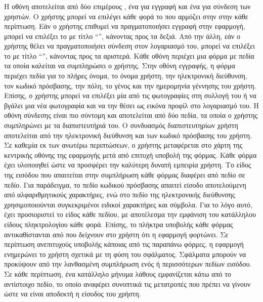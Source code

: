 \subsubsection{}
Η οθόνη αποτελείται από δύο επιμέρους , ένα για εγγραφή και ένα για σύνδεση των χρηστών. Ο χρήστης μπορεί να επιλέγει κάθε φορά το  που αρμόζει στην στην κάθε περίπτωση. Εάν ο χρήστης επιθυμεί να πραγματοποιήσει εγγραφή στην εφαρμογή, μπορεί να επιλέξει το  με τίτλο ``\textit{}'', κάνοντας  προς τα δεξιά. Από την άλλη, εάν ο χρήστης θέλει να πραγματοποιήσει σύνδεση στον λογαριασμό του, μπορεί να επιλέξει το  με τίτλο ``\textit{}'', κάνοντας  προς τα αριστερά.
\newline
\indent
Κάθε οθόνη περιέχει μια φόρμα με πεδία τα οποία καλείται να συμπληρώσει ο χρήστης. Στην οθόνη εγγραφής, η φόρμα περιέχει πεδία για το πλήρες όνομα, το όνομα χρήστη, την ηλεκτρονική διεύθυνση, τον κωδικό πρόσβασης, την πόλη, το γένος και την ημερομηνία γέννησης του χρήστη. Επίσης, ο χρήστης μπορεί να επιλέξει μία από τις φωτογραφίες στη συλλογή του ή να βγάλει μια νέα φωτογραφία και να την θέσει ως εικόνα προφίλ στο λογαριασμό του. Η οθόνη σύνδεσης είναι πιο σύντομη και αποτελείται από δύο πεδία, τα οποία ο χρήστης συμπληρώνει με τα διαπιστευτήριά του. Ο συνδυασμός διαπιστευτηρίων χρήστη αποτελείται από την ηλεκτρονική διεύθυνση και των κωδικό πρόσβασης του χρήστη. Σε καθεμία εκ των ανωτέρω περιπτώσεων, ο χρήστης μεταφέρεται στο χάρτη της κεντρικής οθόνης της εφαρμογής μετά από επιτυχή υποβολή της φόρμας.
\newline
\indent
Κάθε φόρμα έχει υλοποιηθεί ώστε να προσφέρει την καλύτερη δυνατή εμπειρία χρήστη. Το είδος της εισόδου που απαιτείται στην συμπλήρωση κάθε φόρμας διαφέρει από πεδίο σε πεδίο. Για παράδειγμα, το πεδίο κωδικού πρόσβασης απαιτεί είσοδο αποτελούμενη από αλφαριθμητικούς χαρακτήρες, ενώ στο πεδίο της ηλεκτρονικής διεύθυνσης χρησιμοποιούνται συγκεκριμένοι ειδικοί χαρακτήρες και σύμβολα. Για το λόγο αυτό, έχει προσιοριστεί το είδος κάθε πεδίου, με αποτέλεσμα την εμφάνιση του κατάλληλου είδους πληκτρολογίου κάθε φορά. Επίσης, το πλήκτρα υποβολής κάθε φόρμας αντικαθίστανται από  που δείχνουν στο χρήστη ότι η εφαρμογή φορτώνει.
\newline
\indent
Σε περίπτωση ανεπιτυχούς υποβολής κάποιας από τις παραπάνω φόρμες, η εφαρμογή ενημερώνει το χρήστη σχετικά με τη φύση του σφάλματος. Σφάλματα μπορούν να προκύψουν από την λανθασμένη συμπλήρωση ενός ή περισσότερων πεδίων εισόδου. Σε κάθε περίπτωση, ένα κατάλληλο μήνυμα λάθους εμφανίζεται κάτω από το αντίστοιχο πεδίο, το οποίο αναφέρει συνοπτικά τις μετατροπές που πρέπει να γίνουν ώστε να είναι αποδεκτή η είσοδος του χρήστη. 

